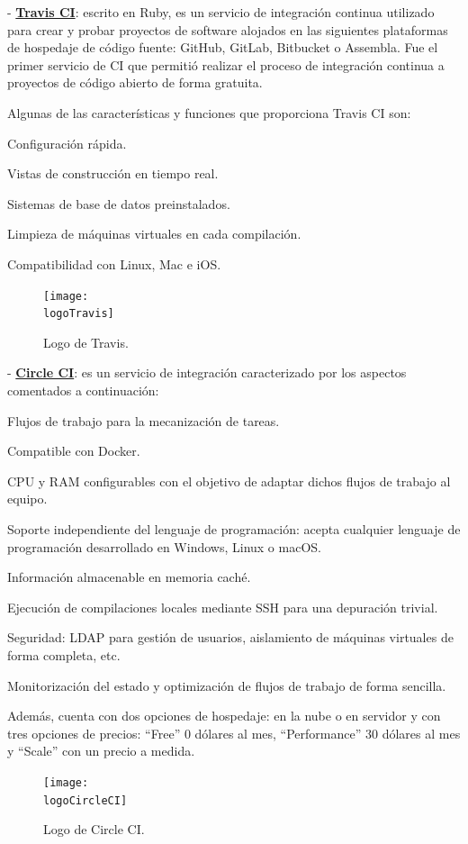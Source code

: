 - \textbf{\underline{Travis CI}}: escrito en Ruby, es un servicio de integración continua utilizado para crear y probar proyectos de software alojados en las siguientes plataformas de hospedaje de código fuente: GitHub, GitLab, Bitbucket o Assembla. Fue el primer servicio de CI que permitió realizar el proceso de integración continua a proyectos de código abierto de forma gratuita.

Algunas de las características y funciones que proporciona Travis CI son:
\begin{compactitem}
    \item Configuración rápida.
    \item Vistas de construcción en tiempo real.
    \item Sistemas de base de datos preinstalados.
    \item Limpieza de máquinas virtuales en cada compilación.
    \item Compatibilidad con Linux, Mac e iOS.
\end{compactitem}

\begin{figure}[h]
    \centering
    \texttt{[image: \\logoTravis]}
    \caption{Logo de Travis.}
\end{figure}

- \textbf{\underline{Circle CI}}: es un servicio de integración caracterizado por los aspectos comentados a continuación:
\begin{compactitem}
    \item Flujos de trabajo para la mecanización de tareas.
    \item Compatible con Docker.
    \item CPU y RAM configurables con el objetivo de adaptar dichos flujos de trabajo al equipo.
    \item Soporte independiente del lenguaje de programación: acepta cualquier lenguaje de programación desarrollado en Windows, Linux o macOS.
    \item Información almacenable en memoria caché.
    \item Ejecución de compilaciones locales mediante SSH para una depuración trivial.
    \item Seguridad: LDAP para gestión de usuarios, aislamiento de máquinas virtuales de forma completa, etc.
    \item Monitorización del estado y optimización de flujos de trabajo de forma sencilla.
\end{compactitem}
Además, cuenta con dos opciones de hospedaje: en la nube o en servidor y con tres opciones de precios: ``Free'' 0 dólares al mes, ``Performance'' 30 dólares al mes y ``Scale'' con un precio a medida.
\begin{figure}[h]
    \centering
    \texttt{[image: \\logoCircleCI]}
    \caption{Logo de Circle CI.}
\end{figure}


